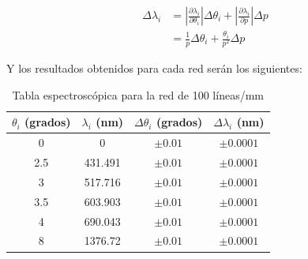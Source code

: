 \documentclass[11pt, a4paper, twocolumn]{article}
\begin{document}
\begin{align}
    \Delta \lambda_{i} & = \left|\frac{\partial \lambda_{i}}{\partial \theta_{i}}\right|\Delta \theta_{i} + \left|\frac{\partial \lambda_{i}}{\partial p}\right|\Delta p \\
    & = \frac{1}{p} \Delta \theta_{i} + \frac{\theta_{i}}{p^2} \Delta p
\end{align}

Y los resultados obtenidos para cada red serán los siguientes:

\begin{table}[H]
    \caption{Tabla espectroscópica para la red de 100 líneas/mm}
    \centering
    \small
    \setlength{\tabcolsep}{4pt}
    \begin{tabular}{cccc}
        \hline
        $\theta_{i}$ (grados) &   $\lambda_{i}$ (nm) &   $\Delta \theta_{i}$ (grados) & $\Delta \lambda_{i}$ (nm)   \\
        \hline
                    0   &          0     &                     $\pm 0.01$ & $ \pm 0.0001$            \\
                    2.5 &        431.491 &                     $\pm 0.01$ & $ \pm 0.0001$            \\
                    3   &        517.716 &                     $\pm 0.01$ & $ \pm 0.0001$            \\
                    3.5 &        603.903 &                     $\pm 0.01$ & $ \pm 0.0001$            \\
                    4   &        690.043 &                     $\pm 0.01$ & $ \pm 0.0001$            \\
                    8   &       1376.72  &                     $\pm 0.01$ & $ \pm 0.0001$            \\
        \hline
    \end{tabular}
\end{table}
\end{document}
